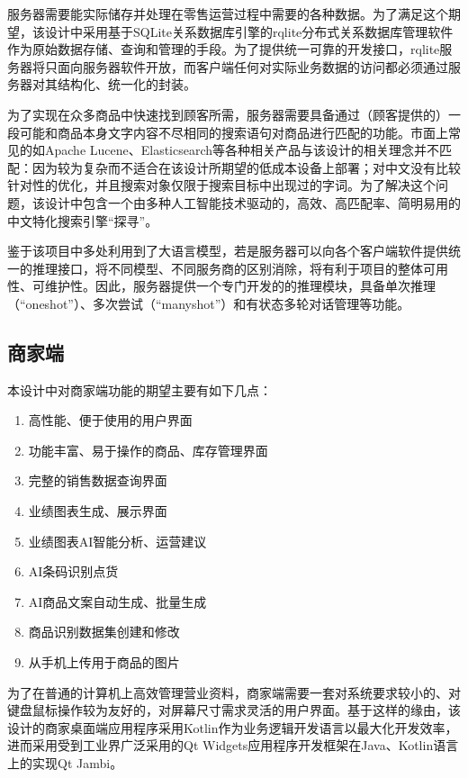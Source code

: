 服务器需要能实际储存并处理在零售运营过程中需要的各种数据。为了满足这个期望，该设计中采用基于SQLite关系数据库引擎的rqlite分布式关系数据库管理软件作为原始数据存储、查询和管理的手段。为了提供统一可靠的开发接口，rqlite服务器将只面向服务器软件开放，而客户端任何对实际业务数据的访问都必须通过服务器对其结构化、统一化的封装。

为了实现在众多商品中快速找到顾客所需，服务器需要具备通过（顾客提供的）一段可能和商品本身文字内容不尽相同的搜索语句对商品进行匹配的功能。市面上常见的如Apache Lucene、Elasticsearch等各种相关产品与该设计的相关理念并不匹配：因为较为复杂而不适合在该设计所期望的低成本设备上部署；对中文没有比较针对性的优化，并且搜索对象仅限于搜索目标中出现过的字词。为了解决这个问题，该设计中包含一个由多种人工智能技术驱动的，高效、高匹配率、简明易用的中文特化搜索引擎“探寻”。

鉴于该项目中多处利用到了大语言模型，若是服务器可以向各个客户端软件提供统一的推理接口，将不同模型、不同服务商的区别消除，将有利于项目的整体可用性、可维护性。因此，服务器提供一个专门开发的的推理模块，具备单次推理（“oneshot”）、多次尝试（“manyshot”）和有状态多轮对话管理等功能。

\subsection{商家端}

本设计中对商家端功能的期望主要有如下几点：

\begin{enumerate}
    \item 高性能、便于使用的用户界面
    \item 功能丰富、易于操作的商品、库存管理界面
    \item 完整的销售数据查询界面
    \item 业绩图表生成、展示界面
    \item 业绩图表AI智能分析、运营建议
    \item AI条码识别点货
    \item AI商品文案自动生成、批量生成
    \item 商品识别数据集创建和修改
    \item 从手机上传用于商品的图片
\end{enumerate}

为了在普通的计算机上高效管理营业资料，商家端需要一套对系统要求较小的、对键盘鼠标操作较为友好的，对屏幕尺寸需求灵活的用户界面。基于这样的缘由，该设计的商家桌面端应用程序采用Kotlin作为业务逻辑开发语言以最大化开发效率，进而采用受到工业界广泛采用的Qt Widgets应用程序开发框架在Java、Kotlin语言上的实现Qt Jambi。


